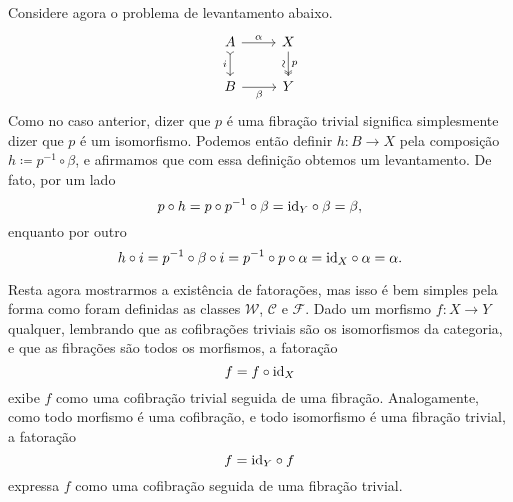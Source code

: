 \begin{exem}
  Considere agora o problema de levantamento abaixo.
  \begin{displaymath}
    \begin{tikzcd}
      A
      \arrow[r, "\alpha"]
      \arrow[d, tail, "i" swap]
      & X
      \arrow[d, two heads, "p", "\sim" {swap, sloped}]
      \\ B
      \arrow[r, "\beta" swap]
      & Y
    \end{tikzcd}
  \end{displaymath}
  Como no caso anterior, dizer que $p$ é uma fibração trivial significa simplesmente dizer que $p$ é um isomorfismo.
  Podemos então definir $h: B \to X$ pela composição $h \coloneqq p^{-1} \circ \beta$, e afirmamos que com essa definição obtemos um levantamento.
  De fato, por um lado
  \begin{displaymath}
    p \circ h = p \circ p^{-1} \circ \beta = \mathrm{id}_{Y} \circ \beta = \beta,
  \end{displaymath}
  enquanto por outro
  \begin{displaymath}
    h \circ i = p^{-1} \circ \beta \circ i = p^{-1} \circ p \circ \alpha = \mathrm{id}_{X} \circ \alpha = \alpha.
  \end{displaymath}

  Resta agora mostrarmos a existência de fatorações, mas isso é bem simples pela forma como foram definidas as classes $\mathcal{W}$, $\mathcal{C}$ e $\mathcal{F}$.
  Dado um morfismo $f: X \to Y$ qualquer, lembrando que as cofibrações triviais são os isomorfismos da categoria, e que as fibrações são todos os morfismos, a fatoração
  \begin{displaymath}
    f = f \circ \mathrm{id}_{X}
  \end{displaymath}
  exibe $f$ como uma cofibração trivial seguida de uma fibração.
  Analogamente, como todo morfismo é uma cofibração, e todo isomorfismo é uma fibração trivial, a fatoração
  \begin{displaymath}
    f = \mathrm{id}_{Y} \circ f
  \end{displaymath}
  expressa $f$ como uma cofibração seguida de uma fibração trivial.
\end{exem}

